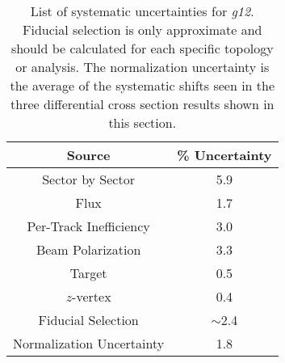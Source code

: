 \begin{table}[htbp]
\begin{minipage}{\columnwidth}
\begin{center}
\begin{singlespacing}

\caption[Systematic Uncertainties]{\label{tab:sysematic.uncertainties}List of systematic uncertainties for \textit{g12}. Fiducial selection is only approximate and should be calculated for each specific topology or analysis. The normalization uncertainty is the average of the systematic shifts seen in the three differential cross section results shown in this section.}

\begin{tabular}{cc}

\hline \hline

Source & \% Uncertainty \\

\hline

Sector by Sector & 5.9 \\
Flux & 1.7 \\
Per-Track Inefficiency & 3.0 \\
Beam Polarization & 3.3 \\
Target & 0.5 \\
$z$-vertex & 0.4 \\
Fiducial Selection & $\sim$2.4 \\
Normalization Uncertainty & 1.8 \\

\hline \hline

\end{tabular}

\end{singlespacing}
\end{center}
\end{minipage}
\end{table}

